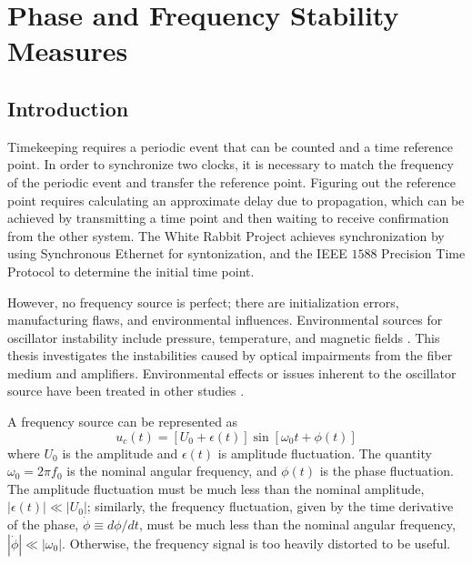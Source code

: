 \chapter{Phase and Frequency Stability Measures}
\label{chap:time_stability}

\section{Introduction}

Timekeeping requires a periodic event that can be counted and a time reference point.  In order to synchronize two clocks, it is necessary to match the frequency of the periodic event and transfer the reference point. Figuring out the reference point requires calculating an approximate delay due to propagation, which can be achieved by transmitting a time point and then waiting to receive confirmation from the other system. The White Rabbit Project achieves synchronization by using Synchronous Ethernet for syntonization, and the IEEE $1588$ Precision Time Protocol \cite{Serrano2013} to determine the initial time point. 

However, no frequency source is perfect; there are initialization errors, manufacturing flaws, and environmental influences. Environmental sources for oscillator instability include pressure, temperature, and magnetic fields \cite{blair1974time}. 
This thesis investigates the instabilities caused by optical impairments from the fiber medium and amplifiers. Environmental effects or issues inherent to the oscillator source have been treated in other studies \cite{blair1974time,Sliwczynski2010,Sliwczynski2015}.

A frequency source can be represented as 
%
\begin{equation}
	\label{eq:freqsignal}
	u_c(t) = [U_0 + \epsilon(t)] \sin[\omega_0t + \phi(t)]
\end{equation}
%
where $U_0$ is the amplitude and $\epsilon(t)$ is amplitude fluctuation. The quantity $\omega_0=2\pi f_0$ is the nominal angular frequency, and $\phi(t)$ is the phase fluctuation. The amplitude fluctuation must be much less than the nominal amplitude, $|\epsilon(t)| \ll |U_0|$; similarly, the frequency fluctuation, given by the time derivative of the phase, $\dot{\phi} \equiv d\phi/dt$, must be much less than the nominal angular frequency, $|\dot{\phi}| \ll |\omega_0|$. Otherwise, the frequency signal is too heavily distorted to be useful.

